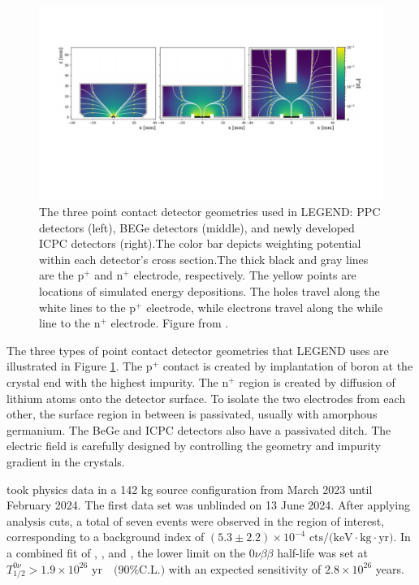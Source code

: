\begin{figure}[!htb]
  \includegraphics[trim=15 30 15 20,clip,width=\linewidth]{ch2/figs/Det-geo-2.pdf}
\caption{The three point contact detector geometries used in LEGEND: {\MJD} PPC detectors (left), {\Gerda} BEGe detectors (middle), and newly developed ICPC detectors (right).The color bar depicts weighting potential within each detector's cross section.The thick black and gray lines are the p$^+$ and n$^+$ electrode, respectively. The yellow points are locations of simulated energy depositions. The holes travel along the white lines to the p$^+$ electrode, while electrons travel along the while line to the n$^+$ electrode. Figure from \cite{Comellato:2020ljj}.}
\label{fig:det-compare}
  \end{figure}
  
The three types of point contact detector geometries that LEGEND uses are illustrated in Figure \ref{fig:det-compare}. The p$^+$ contact is created by implantation of boron at the crystal end with the highest impurity. The n$^+$ region is created by diffusion of lithium atoms onto the detector surface. To isolate the two electrodes from each other, the surface region in between is passivated, usually with amorphous germanium. The BeGe and ICPC detectors also have a passivated ditch. The electric field is carefully designed by controlling the geometry and impurity gradient in the crystals. 


{\Ltwo} took physics data in a 142 kg source configuration from March 2023 until February 2024. The first data set was unblinded on 13 June 2024. After applying analysis cuts, a total of seven events were observed in the region of interest, corresponding to a background index of $ (5.3 \pm 2.2) \times 10^{-4} \text{ cts/(keV$\cdot$kg$\cdot$yr)}$. In a combined fit of {\Gerda}, {\MJD}, and {\Ltwo}, the lower limit on the 0$\nu\beta\beta$ half-life was set at $T^{0\nu}_{1/2} > 1.9 \times 10^{26} \text{ yr} \quad \text{(90\% C.L.)}$ with an expected sensitivity of $2.8 \times 10^{26}$ years. \cite{Pertoldi2024}

